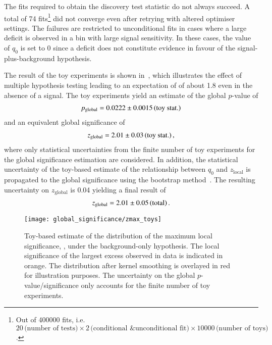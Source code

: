 The fits required to obtain the discovery test statistic do not always
succeed. A total of \num{74} fits\footnote{Out of \num{400000} fits, i.e.\
  $20\,\text{(number of tests)} \times 2\,\text{(conditional \& unconditional
    fit)} \times \num{10000}\,\text{(number of toys)}$.}  did not converge even
after retrying with altered optimiser settings. The failures are restricted to
unconditional fits in cases where a large deficit is observed in a bin with
large signal sensitivity. In these cases, the value of $q_0$ is set to 0 since a
deficit does not constitute evidence in favour of the signal-plus-background
hypothesis.

The result of the toy experiments is shown in~, which
illustrates the effect of multiple hypothesis testing leading to an expectation
of \Zmaxlocal of about \num{1.8} even in the absence of a signal. The toy
experiments yield an estimate of the global $p$-value of
\begin{align*}
  \pglobal = \num{0.0222}\numerrt{0.0015}{toy stat.}
\end{align*}
and an equivalent global significance of
\begin{align*}
  \zglobal = \num{2.01}\numerrt{0.03}{toy stat.} \,\text{,}
\end{align*}
where only statistical uncertainties from the finite number of toy experiments
for the global significance estimation are considered. In addition, the
statistical uncertainty of the toy-based estimate of the relationship between
$q_0$ and $z_{\text{local}}$ is propagated to the global significance using the
bootstrap method~\cite{10.1214/aos/1176344552,efron1994introduction}. The
resulting uncertainty on $z_{\text{global}}$ is \num{0.04} yielding a final
result of
\begin{align*}
  \zglobal = \num{2.01}\numerrt{0.05}{total} \,\text{.}
\end{align*}

\begin{figure}[htbp]
  \centering

  \texttt{[image: global\_significance/zmax\_toys]}

  \caption[Toy-based estimate of the distribution of the maximum local
  significance under the background-only hypothesis.]{Toy-based estimate of the
    distribution of the maximum local significance, \Zmaxlocal, under the
    background-only hypothesis. The local significance of the largest excess
    observed in data is indicated in orange. The distribution after kernel
    smoothing is overlayed in red for illustration purposes. The uncertainty on
    the global $p$-value/significance only accounts for the finite number of toy
    experiments.}%
  \label{fig:zmax_toys}
\end{figure}

